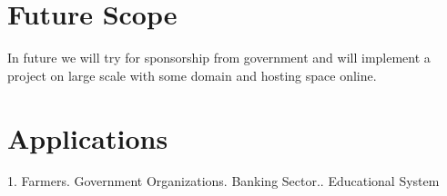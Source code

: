 \documentclass[oneside,a4paper,12pt]{report}
\begin{document}
{\section{Future Scope}

In future we will try for sponsorship from government and will implement a project on large scale with some domain and hosting space online.

\section{Applications}

1.	Farmers.	Government Organizations.	Banking Sector..	Educational System\newline




}
\end{document}
